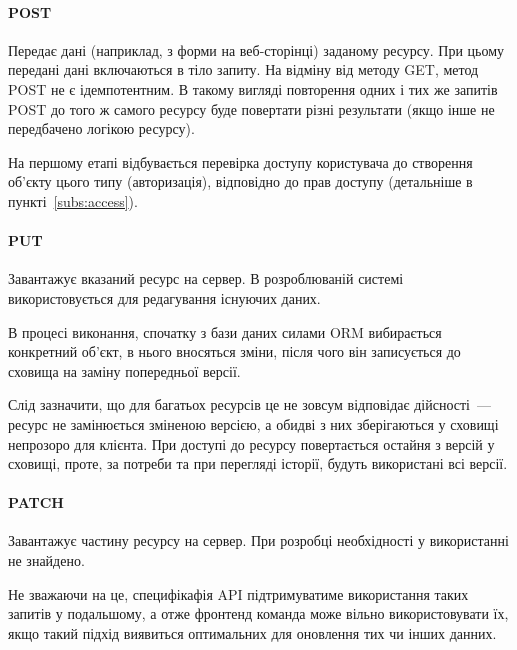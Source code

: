\paragraph{POST}

Передає дані (наприклад, з форми на веб-сторінці) заданому ресурсу. При цьому передані дані включаються в тіло запиту. На відміну від методу GET, метод POST не є ідемпотентним. В такому вигляді повторення одних і тих же запитів POST до того ж самого ресурсу буде повертати різні результати (якщо інше не передбачено логікою ресурсу).

На першому етапі відбувається перевірка доступу користувача до створення об’єкту цього типу (авторизація), відповідно до прав доступу (детальніше в пункті~\ref{subs:access}).

\paragraph{PUT}

Завантажує вказаний ресурс на сервер. В розроблюваній системі використовується для редагування існуючих даних. 

В процесі виконання, спочатку з бази даних силами ORM вибирається конкретний об’єкт, в нього вносяться зміни, після чого він записується до сховища на заміну попередньої версії.

Слід зазначити, що для багатьох ресурсів це не зовсум відповідає дійсності~--- ресурс не замінюється зміненою версією, а обидві з них зберігаються у сховищі непрозоро для клієнта. При доступі до ресурсу повертається остайня з версій у сховищі, проте, за потреби та при перегляді історії, будуть використані всі версії.

\paragraph{PATCH}

Завантажує частину ресурсу на сервер. При розробці необхідності у використанні не знайдено. 

Не зважаючи на це, специфікафія API підтримуватиме використання таких запитів у подальшому, а отже фронтенд команда може вільно використовувати їх, якщо такий підхід виявиться оптимальних для оновлення тих чи інших данних.


